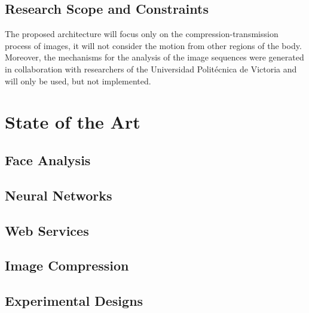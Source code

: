 \documentclass[12pt,letterpaper,titlepage]{article}
\begin{document}
\subsection{Research Scope and Constraints}
The proposed architecture will focus only on the compression-transmission process of images, it will not consider the motion from other regions of the body. Moreover, the mechanisms for the analysis of the image sequences were generated in collaboration with researchers of the Universidad Polit\'ecnica de Victoria and will only be used, but not implemented.

\newpage
\section{State of the Art}
\subsection{Face Analysis}
	
\subsection{Neural Networks}
	
\subsection{Web Services}
	
\subsection{Image Compression}
	
\subsection{Experimental Designs}
	

\clearpage
\end{document}
